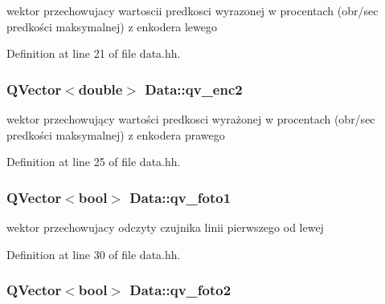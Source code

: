 wektor przechowujacy wartoscii predkosci wyrazonej w procentach (obr/sec predkości maksymalnej) z enkodera lewego 



Definition at line 21 of file data.\+hh.

\subsubsection[{\texorpdfstring{qv\+\_\+enc2}{qv_enc2}}]{\setlength{\rightskip}{0pt plus 5cm}Q\+Vector$<$double$>$ Data\+::qv\+\_\+enc2\hspace{0.3cm}{\ttfamily [private]}}\hypertarget{class_data_ab2e63e74c9feb6090a6b7ac202c35535}{}\label{class_data_ab2e63e74c9feb6090a6b7ac202c35535}


wektor przechowujący wartości predkosci wyrażonej w procentach (obr/sec predkości maksymalnej) z enkodera prawego 



Definition at line 25 of file data.\+hh.

\subsubsection[{\texorpdfstring{qv\+\_\+foto1}{qv_foto1}}]{\setlength{\rightskip}{0pt plus 5cm}Q\+Vector$<$bool$>$ Data\+::qv\+\_\+foto1\hspace{0.3cm}{\ttfamily [private]}}\hypertarget{class_data_af9e50ef903c8ee4a962493b3b0a2bf41}{}\label{class_data_af9e50ef903c8ee4a962493b3b0a2bf41}


wektor przechowujacy odczyty czujnika linii pierwszego od lewej 



Definition at line 30 of file data.\+hh.

\subsubsection[{\texorpdfstring{qv\+\_\+foto2}{qv_foto2}}]{\setlength{\rightskip}{0pt plus 5cm}Q\+Vector$<$bool$>$ Data\+::qv\+\_\+foto2\hspace{0.3cm}{\ttfamily [private]}}\hypertarget{class_data_aca198f3fc0cf108787779382ad6c91b8}{}\label{class_data_aca198f3fc0cf108787779382ad6c91b8}


